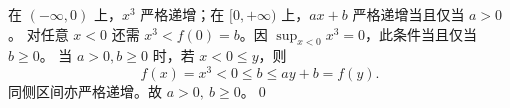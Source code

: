 在 $(-\infty,0)$ 上，$x^3$ 严格递增；在 $[0,+\infty)$ 上，$ax+b$ 严格递增当且仅当 $a>0$。
对任意 $x<0$ 还需 $x^3<f(0)=b$。因 $\sup_{x<0}x^3=0$，此条件当且仅当 $b\ge0$。
当 $a>0,b\ge0$ 时，若 $x<0\le y$，则
\[
f(x)=x^3<0\le b\le ay+b=f(y).
\]
同侧区间亦严格递增。故 $\boxed{a>0,\ b\ge0}$。\qed
